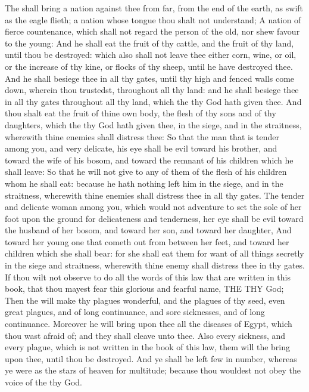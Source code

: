 \begin{biblechapter}
\verse The \LORD shall bring a nation against thee from far, from the end of the earth, as swift as the eagle flieth; a nation whose tongue thou shalt not understand;
\verse A nation of fierce countenance, which shall not regard the person of the old, nor shew favour to the young:
\verse And he shall eat the fruit of thy cattle, and the fruit of thy land, until thou be destroyed: which also shall not leave thee either corn, wine, or oil, or the increase of thy kine, or flocks of thy sheep, until he have destroyed thee.
\verse And he shall besiege thee in all thy gates, until thy high and fenced walls come down, wherein thou trustedst, throughout all thy land: and he shall besiege thee in all thy gates throughout all thy land, which the \LORD thy God hath given thee.
\verse And thou shalt eat the fruit of thine own body, the flesh of thy sons and of thy daughters, which the \LORD thy God hath given thee, in the siege, and in the straitness, wherewith thine enemies shall distress thee:
\verse So that the man that is tender among you, and very delicate, his eye shall be evil toward his brother, and toward the wife of his bosom, and toward the remnant of his children which he shall leave:
\verse So that he will not give to any of them of the flesh of his children whom he shall eat: because he hath nothing left him in the siege, and in the straitness, wherewith thine enemies shall distress thee in all thy gates.
\verse The tender and delicate woman among you, which would not adventure to set the sole of her foot upon the ground for delicateness and tenderness, her eye shall be evil toward the husband of her bosom, and toward her son, and toward her daughter,
\verse And toward her young one that cometh out from between her feet, and toward her children which she shall bear: for she shall eat them for want of all things secretly in the siege and straitness, wherewith thine enemy shall distress thee in thy gates.
\verse If thou wilt not observe to do all the words of this law that are written in this book, that thou mayest fear this glorious and fearful name, THE \LORD THY God;
\verse Then the \LORD will make thy plagues wonderful, and the plagues of thy seed, even great plagues, and of long continuance, and sore sicknesses, and of long continuance.
\verse Moreover he will bring upon thee all the diseases of Egypt, which thou wast afraid of; and they shall cleave unto thee.
\verse Also every sickness, and every plague, which is not written in the book of this law, them will the \LORD bring upon thee, until thou be destroyed.
\verse And ye shall be left few in number, whereas ye were as the stars of heaven for multitude; because thou wouldest not obey the voice of the \LORD thy God.

\end{biblechapter}
